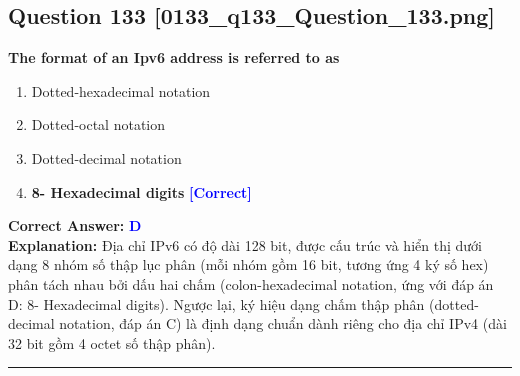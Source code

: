 \documentclass[11pt,a4paper]{article}
\begin{document}
\begin{minipage}{\textwidth}
\subsection*{Question 133 \quad \footnotesize{[0133\_q133\_Question\_133.png]}}
\noindent \textbf{The format of an Ipv6 address is referred to as}

\begin{enumerate}[label=\Alph*.]
    \item Dotted-hexadecimal notation
    \item Dotted-octal notation
    \item Dotted-decimal notation
    \item \textbf{8- Hexadecimal digits} \hfill \textcolor{blue}{\textbf{[Correct]}}
\end{enumerate}

\noindent \textbf{Correct Answer:} \textcolor{blue}{\textbf{D}} \\[2pt]
\noindent \textbf{Explanation:} Địa chỉ IPv6 có độ dài 128 bit, được cấu trúc và hiển thị dưới dạng 8 nhóm số thập lục phân (mỗi nhóm gồm 16 bit, tương ứng 4 ký số hex) phân tách nhau bởi dấu hai chấm (colon-hexadecimal notation, ứng với đáp án D: 8- Hexadecimal digits). Ngược lại, ký hiệu dạng chấm thập phân (dotted-decimal notation, đáp án C) là định dạng chuẩn dành riêng cho địa chỉ IPv4 (dài 32 bit gồm 4 octet số thập phân).

\par\vspace{0.3cm}
\hrule
\vspace{0.3cm}
\end{minipage}
\end{document}
